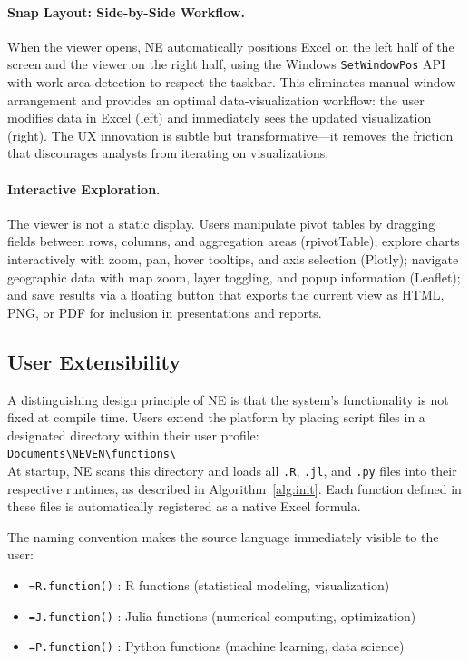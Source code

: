 \documentclass[preprint,12pt,authoryear]{elsarticle}
\newcommand{\neven}{NE\raisebox{0.2ex}{v}\rotatebox[origin=c]{180}{E}\rotatebox[origin=c]{180}{N}}
\begin{document}
\paragraph{Snap Layout: Side-by-Side Workflow.}
When the viewer opens, \neven{} automatically positions Excel on the left half of the screen and the viewer on the right half, using the Windows \texttt{SetWindowPos} API with work-area detection to respect the taskbar. This eliminates manual window arrangement and provides an optimal data-visualization workflow: the user modifies data in Excel (left) and immediately sees the updated visualization (right). The UX innovation is subtle but transformative---it removes the friction that discourages analysts from iterating on visualizations.

\paragraph{Interactive Exploration.}
The viewer is not a static display. Users manipulate pivot tables by dragging fields between rows, columns, and aggregation areas (rpivotTable); explore charts interactively with zoom, pan, hover tooltips, and axis selection (Plotly); navigate geographic data with map zoom, layer toggling, and popup information (Leaflet); and save results via a floating button that exports the current view as HTML, PNG, or PDF for inclusion in presentations and reports.

\subsection{User Extensibility}
\label{subsec:extensibility}

A distinguishing design principle of \neven{} is that the system's functionality is not fixed at compile time. Users extend the platform by placing script files in a designated directory within their user profile:\\ 

{\texttt{Documents\textbackslash NEVEN\textbackslash functions\textbackslash}}\\

At startup, \neven{} scans this directory and loads all \texttt{.R}, \texttt{.jl}, and \texttt{.py} files into their respective runtimes, as described in Algorithm~\ref{alg:init}. Each function defined in these files is automatically registered as a native Excel formula.

The naming convention makes the source language immediately visible to the user:
\begin{itemize}
    \item \texttt{=R.function()} : R functions (statistical modeling, visualization)
    \item \texttt{=J.function()} : Julia functions (numerical computing, optimization)
    \item \texttt{=P.function()} : Python functions (machine learning, data science)
\end{itemize}
\end{document}
